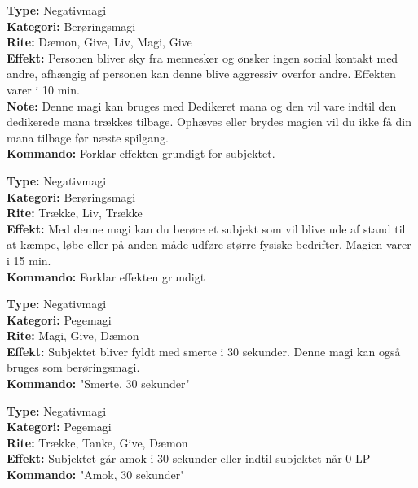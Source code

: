 \begin{offensiv*}[Aggressiv]
\textbf{Type:} Negativmagi\\
\textbf{Kategori:} Berøringsmagi\\
\textbf{Rite:} Dæmon, Give, Liv, Magi, Give\\ 
\textbf{Effekt:} Personen bliver sky fra mennesker og ønsker ingen social kontakt med andre, afhængig af personen kan denne blive aggressiv overfor andre. Effekten varer i 10 min.\\
\textbf{Note:} Denne magi kan bruges med Dedikeret mana og den vil vare indtil den dedikerede mana trækkes tilbage. Ophæves eller brydes magien vil du ikke få din mana tilbage før næste spilgang.\\
\textbf{Kommando:} Forklar effekten grundigt for subjektet.
\end{offensiv*}

\begin{offensiv*}[Svaghed]
\textbf{Type:} Negativmagi\\
\textbf{Kategori:} Berøringsmagi\\ 
\textbf{Rite:} Trække, Liv, Trække\\
\textbf{Effekt:} Med denne magi kan du berøre et subjekt som vil blive ude af stand til at kæmpe, løbe eller på anden måde udføre større fysiske bedrifter. Magien varer i 15 min.\\
\textbf{Kommando:} Forklar effekten grundigt
\end{offensiv*}

\begin{offensiv*}[Smerte]
\textbf{Type:} Negativmagi\\
\textbf{Kategori:} Pegemagi\\
\textbf{Rite:} Magi, Give, Dæmon\\
\textbf{Effekt:} Subjektet bliver fyldt med smerte i 30 sekunder. Denne magi kan også bruges som berøringsmagi.\\
\textbf{Kommando:} "Smerte, 30 sekunder"
\end{offensiv*}

\begin{offensiv*}[Amok]
\textbf{Type:} Negativmagi\\
\textbf{Kategori:} Pegemagi\\
\textbf{Rite:} Trække, Tanke, Give, Dæmon\\
\textbf{Effekt:} Subjektet går amok i 30 sekunder eller indtil subjektet når 0 LP\\
\textbf{Kommando:} "Amok, 30 sekunder"\\
\end{offensiv*}

